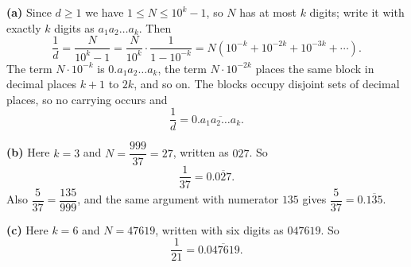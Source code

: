 \textbf{(a)} Since $d\ge1$ we have $1\le N\le10^k-1$, so $N$ has at most $k$ digits; write it with exactly $k$ digits as $a_1a_2\dots a_k$. Then
\[\dfrac1d=\dfrac{N}{10^k-1}=\dfrac{N}{10^k}\cdot\dfrac{1}{1-10^{-k}}=N\left(10^{-k}+10^{-2k}+10^{-3k}+\cdots\right).\]
The term $N\cdot10^{-k}$ is $0.a_1a_2\dots a_k$, the term $N\cdot10^{-2k}$ places the same block in decimal places $k+1$ to $2k$, and so on. The blocks occupy disjoint sets of decimal places, so no carrying occurs and
\[\dfrac1d=0.\overline{a_1a_2\dots a_k}.\]

\textbf{(b)} Here $k=3$ and $N=\dfrac{999}{37}=27$, written as $027$. So
\[\dfrac{1}{37}=\boxed{0.\overline{027}}.\]
Also $\dfrac{5}{37}=\dfrac{135}{999}$, and the same argument with numerator $135$ gives $\dfrac{5}{37}=\boxed{0.\overline{135}}$.

\textbf{(c)} Here $k=6$ and $N=47619$, written with six digits as $047619$. So
\[\dfrac{1}{21}=\boxed{0.\overline{047619}}.\]
